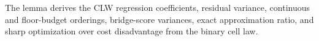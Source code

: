 The lemma derives the CLW regression coefficients, residual variance, continuous and floor-budget orderings, bridge-score variances, exact approximation ratio, and sharp optimization over cost disadvantage from the binary cell law.